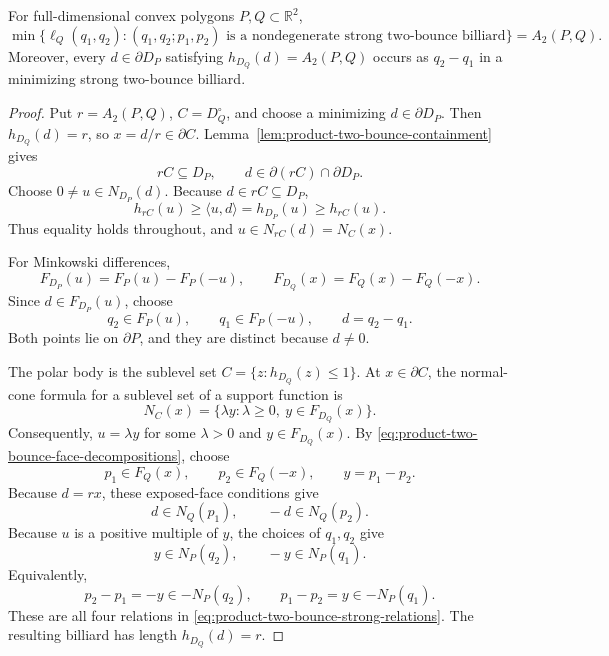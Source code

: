 \begin{unverified}
\begin{theorem}
\label{thm:product-strong-two-bounce}
For full-dimensional convex polygons \(P,Q\subset\mathbb R^2\),
\begin{equation}
\label{eq:product-strong-two-bounce-minimum}
 \min\{\ell_Q(q_1,q_2):
       (q_1,q_2;p_1,p_2)\text{ is a nondegenerate strong two-bounce
       billiard}\}
 =A_2(P,Q).
\end{equation}
Moreover, every \(d\in\partial D_P\) satisfying
\(h_{D_Q}(d)=A_2(P,Q)\) occurs as \(q_2-q_1\) in a minimizing strong
two-bounce billiard.
\end{theorem}

\begin{proof}
Put \(r=A_2(P,Q)\), \(C=D_Q^\circ\), and choose a minimizing
\(d\in\partial D_P\).  Then \(h_{D_Q}(d)=r\), so
\(x=d/r\in\partial C\).  Lemma~\ref{lem:product-two-bounce-containment}
gives
\[
 rC\subseteq D_P,\qquad d\in\partial(rC)\cap\partial D_P.
\]
Choose \(0\neq u\in N_{D_P}(d)\).  Because \(d\in rC\subseteq D_P\),
\[
 h_{rC}(u)\geq\langle u,d\rangle
 =h_{D_P}(u)\geq h_{rC}(u).
\]
Thus equality holds throughout, and \(u\in N_{rC}(d)=N_C(x)\).

For Minkowski differences,
\begin{equation}
\label{eq:product-two-bounce-face-decompositions}
 F_{D_P}(u)=F_P(u)-F_P(-u),\qquad
 F_{D_Q}(x)=F_Q(x)-F_Q(-x).
\end{equation}
Since \(d\in F_{D_P}(u)\), choose
\[
 q_2\in F_P(u),\qquad q_1\in F_P(-u),\qquad d=q_2-q_1.
\]
Both points lie on \(\partial P\), and they are distinct because \(d\neq0\).

The polar body is the sublevel set
\(C=\{z:h_{D_Q}(z)\leq1\}\).  At \(x\in\partial C\), the normal-cone
formula for a sublevel set of a support function is
\[
 N_C(x)=\{\lambda y:\lambda\geq0,\ y\in F_{D_Q}(x)\}.
\]
Consequently, \(u=\lambda y\) for some \(\lambda>0\) and
\(y\in F_{D_Q}(x)\).  By
\eqref{eq:product-two-bounce-face-decompositions}, choose
\[
 p_1\in F_Q(x),\qquad p_2\in F_Q(-x),\qquad y=p_1-p_2.
\]
Because \(d=rx\), these exposed-face conditions give
\[
 d\in N_Q(p_1),\qquad -d\in N_Q(p_2).
\]
Because \(u\) is a positive multiple of \(y\), the choices of \(q_1,q_2\)
give
\[
 y\in N_P(q_2),\qquad -y\in N_P(q_1).
\]
Equivalently,
\[
 p_2-p_1=-y\in-N_P(q_2),\qquad
 p_1-p_2=y\in-N_P(q_1).
\]
These are all four relations in
\eqref{eq:product-two-bounce-strong-relations}.  The resulting billiard has
length \(h_{D_Q}(d)=r\).


\end{proof}
\end{unverified}

